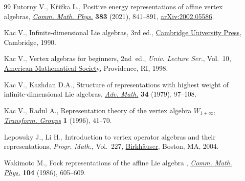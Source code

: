 \begin{thebibliography}{99}
Futorny V., K\v{r}i\v{z}ka L., Positive energy representations of affine vertex
 algebras, \href{https://doi.org/10.1007/s00220-020-03861-7}{\textit{Comm.
 Math. Phys.}} \textbf{383} (2021), 841--891,
 \href{http://arxiv.org/abs/2002.05586}{arXiv:2002.05586}.

Kac V., Infinite-dimensional {L}ie algebras, 3rd ed.,
 \href{https://doi.org/10.1017/CBO9780511626234}{Cambridge University Press},
 Cambridge, 1990.

Kac V., Vertex algebras for beginners, 2nd~ed., \textit{Univ. Lecture Ser.}, Vol.~10, \href{https://doi.org/10.1090/ulect/010}{American Mathematical
 Society}, Providence, RI, 1998.

Kac V., Kazhdan D.A., Structure of representations with highest weight of
 infinite-dimensional {L}ie algebras,
 \href{https://doi.org/10.1016/0001-8708(79)90066-5}{\textit{Adv. Math.}}
 \textbf{34} (1979), 97--108.

Kac V., Radul A., Representation theory of the vertex algebra {$W_{1+\infty}$},
 \href{https://doi.org/10.1007/BF02587735}{\textit{Transform. Groups}}
 \textbf{1} (1996), 41--70.

Lepowsky J., Li H., Introduction to vertex operator algebras and their
 representations, \textit{Progr. Math.}, Vol.~227,
 \href{https://doi.org/10.1007/978-0-8176-8186-9}{Birkh\"{a}user}, Boston, MA,
 2004.

Wakimoto M., Fock representations of the affine {L}ie algebra
 , \href{https://doi.org/10.1007/BF01211068}{\textit{Comm.
 Math. Phys.}} \textbf{104} (1986), 605--609.

\end{thebibliography}
